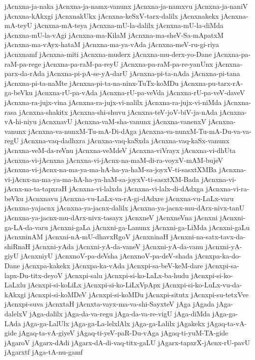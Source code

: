 {jAcnxna-ja-naka
jAcnxna-ja-namx-vanunx
jAcnxna-ja-namxvu
jAcnxna-ja-naniV
jAcnxna-kAkxgi
jAcnxnakUkx
jAcnxna-keSxV-tarx-dalilx
jAcnxnakekx
jAcnxna-mA-teyU
jAcnxna-mA-teya
jAcnxna-mU-la-dalilx
jAcnxna-mU-la-diMda
jAcnxna-mU-la-vAgi
jAcnxna-ma-KilaM
jAcnxna-ma-sheV-Sa-mApatxM
jAcnxna-ma-vAyx-hataM
jAcnxna-ma-ya-vAda
jAcnxna-meV-ru-gi-riya
jAcnxnamf
jAcnxna-miti
jAcnxna-muderx
jAcnxna-mu-derx-yo-Dane
jAcnxna-pa-raM-pa-rege
jAcnxna-pa-raM-pa-reyU
jAcnxna-pa-raM-pa-re-yanUnx
jAcnxna-parx-da-rAda
jAcnxna-pi-pA-se-yA-darU
jAcnxna-pi-ta-nAda
jAcnxna-pi-tana
jAcnxna-pi-ta-naMte
jAcnxna-pi-ta-na-ninx-TuTx-koMDu
jAcnxna-pu-tarx-rA-ga-beVku
jAcnxna-rU-pa-vAda
jAcnxna-rU-pa-veVda
jAcnxna-rU-pa-veV-daveV
jAcnxna-ra-jujx-vina
jAcnxna-ra-jujx-vi-nalilx
jAcnxna-ra-jujx-vi-niMda
jAcnxna-rasa
jAcnxna-shakitx
jAcnxna-shi-shuvu
jAcnxna-teV-joV-biV-ja-nAda
jAcnxna-vA-hi-niyu
jAcnxnavU
jAcnxna-vaM-sha-vanunx
jAcnxna-vanenxV
jAcnxna-vanunx
jAcnxna-va-nunxM-Tu-mA-Di-dAga
jAcnxna-va-nunxM-Tu-mA-Du-va-va-regU
jAcnxna-vaq-dadhxra
jAcnxna-vaq-kaSxda
jAcnxna-vaq-kaSx-vanunx
jAcnxna-veM-da-reVnu
jAcnxna-veMdeV
jAcnxna-viVrayx
jAcnxna-vi-dhUta
jAcnxna-vi-jAcnxna
jAcnxna-vi-jAcnx-na-maM-di-ra-voyxV-mAM-bujeV
jAcnxna-vi-jAcnx-na-ma-ya-ma-hA-ha-ya-haM-sa-joyxV-ti-sasxtXMBa
jAcnxna-vi-jAcnx-na-ma-ya-ma-hA-ha-ya-haM-sa-joyxV-ti-sasxtXM-Bada
jAcnxna-vi-jAcnx-na-ta-tapxraH
jAcnxna-vi-lalxda
jAcnxna-vi-lalx-di-dAdxga
jAcnxna-vi-ra-beVku
jAcnxnavu
jAcnxna-vu-LaLx-va-rA-gi-dAdxre
jAcnxna-vu-LaLx-varu
jAcnxna-yajacnx
jAcnxna-ya-jacnx-dalilx
jAcnxna-ya-jacnx-mu-dArx-nivx-tanU
jAcnxna-ya-jacnx-mu-dArx-nivx-tasayx
jAcnxneV
jAcnxneVna
jAcnxni
jAcnxni-ga-LA-da-varu
jAcnxni-gaLa
jAcnxni-ga-Lanunx
jAcnxni-ga-LiMda
jAcnxni-gaLu
jAcnxninAM
jAcnxni-nA-mU-dhavxRgoV
jAcnxninaH
jAcnxni-na-satx-tavx-da-shiRnaH
jAcnxni-yAda
jAcnxni-yA-da-vaneV
jAcnxni-yA-da-vanu
jAcnxni-yA-giyU
jAcnxniyU
jAcnxnoV-pa-deVsha
jAcnxnoV-pa-deV-shada
jAcnxpa-ka-do-Dane
jAcnxpa-kakekx
jAcnxpa-ka-vAda
jAcnxpi-sa-beV-keM-dare
jAcnxpi-sa-lapx-Du-titx-deyoV
jAcnxpi-salu
jAcnxpi-si-ko-LaLx-ba-hudu
jAcnxpi-si-ko-LaLxlu
jAcnxpi-si-koLiLx
jAcnxpi-si-ko-LiLxVpApx
jAcnxpi-si-ko-LuLx-vu-da-kAkxgi
jAcnxpi-si-koMDeV
jAcnxpi-si-koMDu
jAcnxpi-situtx
jAcnxpi-su-tetxVve
jAcnxpi-suva
jAcnxtaH
jAcnxta-vayx-ma-va-shi-SayxteV
jAga
jAgada
jAga-dalelxV
jAga-dalilx
jAga-da-va-regu
jAga-da-va-re-vigU
jAga-diMda
jAga-ga-LAda
jAga-ga-LalUlx
jAga-ga-La-lelxlAlx
jAga-ga-Lalilx
jAgakekx
jAgaq-ta-vA-gide
jAgaq-ta-vA-giyeV
jAgaq-ti-yeV-paR-Du-vAga
jAgaq-ti-yuM-TA-gide
jAgaroV
jAgarx-dAdi
jAgarx-dA-di-vaq-titx-gaLU
jAgarx-tapxrX-jAcnx-rU-pavU
jAgarxtf
jAga-tA-nu-gamf
}
